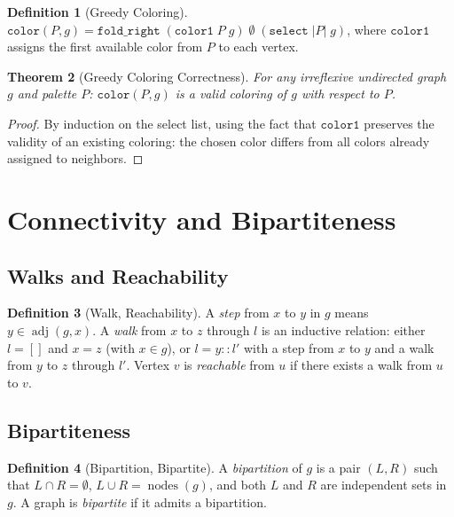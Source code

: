 \documentclass[11pt]{article}
\theoremstyle{plain}
\newtheorem{theorem}{Theorem}[section]
\theoremstyle{definition}
\newtheorem{definition}[theorem]{Definition}
\theoremstyle{remark}
\newcommand{\adj}{\operatorname{adj}}
\newcommand{\nodes}{\operatorname{nodes}}
\begin{document}
\begin{definition}[Greedy Coloring]
$\texttt{color}(P, g) = \texttt{fold\_right}\;(\texttt{color1}\; P\; g)\; \emptyset\; (\texttt{select}\;|P|\;g)$,
where $\texttt{color1}$ assigns the first available color from $P$ to each vertex.
\end{definition}

\begin{theorem}[Greedy Coloring Correctness]
\label{thm:greedy}
For any irreflexive undirected graph $g$ and palette $P$:
$\texttt{color}(P, g)$ is a valid coloring of $g$ with respect to $P$.
\end{theorem}

\begin{proof}
By induction on the select list, using the fact that $\texttt{color1}$ preserves the validity of an existing coloring: the chosen color differs from all colors already assigned to neighbors.
\end{proof}

\section{Connectivity and Bipartiteness}
\label{sec:bipartite}

\subsection{Walks and Reachability}

\begin{definition}[Walk, Reachability]
A \emph{step} from $x$ to $y$ in $g$ means $y \in \adj(g, x)$.
A \emph{walk} from $x$ to $z$ through $l$ is an inductive relation: either $l = []$ and $x = z$ (with $x \in g$), or $l = y :: l'$ with a step from $x$ to $y$ and a walk from $y$ to $z$ through $l'$.
Vertex $v$ is \emph{reachable} from $u$ if there exists a walk from $u$ to $v$.
\end{definition}

\subsection{Bipartiteness}

\begin{definition}[Bipartition, Bipartite]
A \emph{bipartition} of $g$ is a pair $(L, R)$ such that $L \cap R = \emptyset$, $L \cup R = \nodes(g)$, and both $L$ and $R$ are independent sets in $g$. A graph is \emph{bipartite} if it admits a bipartition.
\end{definition}
\end{document}
